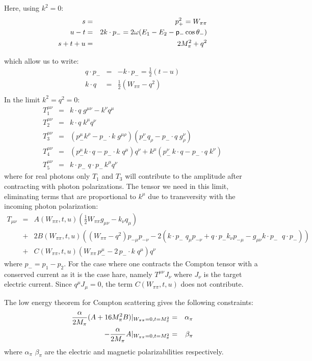 \documentclass[12pt,epsfig]{article}
\newcommand{\bea}{\begin{eqnarray}}
\newcommand{\eea}{\end{eqnarray}}
\begin{document}
Here, using $k^2=0$:
\bea
s&=& p_+^2=W_{\pi\pi}\nonumber\\
u-t&=&2 k \cdot p_-=2 \omega (E_1-E_2- { \sf{ p}}_- \cos \theta_-)\nonumber\\
s+t+u&=&2 M_\pi^2+q^2
\eea

which allow us to write:
\bea
q\cdot p_-&=& -k\cdot p_-=\frac{1}{2} (t-u)\nonumber\\
k\cdot q&=&\frac 12 (W_{\pi\pi}-q^2)\nonumber\\

\eea
In the limit $k^2=q^2=0$:
\bea
T_1^{\mu\nu}&=& k\cdot q\; g^{\mu\nu}-k^\nu q^\mu   \nonumber\\
T_2^{\mu\nu}&=&k\cdot q \; k^\mu  q^\nu   \nonumber\\
T_3^{\mu\nu}&=& (p_-^\mu k^\rho-p_-\!\cdot k \;g^{\mu\rho})(p_-^\nu q_\rho-p_-\!\cdot q \;g_\rho^\nu)  \nonumber\\
T_4^{\mu\nu}&=& (p_-^\mu k\cdot q-p_-\!\cdot k\; q^{\mu })  q^\nu+ k^\mu   (p_-^\nu \,k\cdot q-p_-\!\cdot q\; k^\nu)  \nonumber\\
T_5^{\mu\nu}&=&  k\cdot  p_- \; q\cdot  p_- \,k^\mu q^\nu 
\eea
where for real photons only $T_1$ and $T_3$ will contribute to the amplitude after contracting with photon polarizations. 
The tensor we need in this limit, eliminating terms that are proportional to $k^\mu$ due to transversity with the incoming photon polarization:
\bea
T_{\mu\nu}&=&A(W_{\pi\pi},t,u) (\frac 12 W_{\pi\pi} g_{\mu\nu}-k_\nu q_\mu)\\
&+&2 B(W_{\pi\pi},t,u)  ( (W_{\pi\pi}-q^2) p_{-\mu} p_{-\nu}-2(k\cdot p_-\; q_\mu p_{-\nu}+q\cdot p_{-} k_\nu p_{-\mu}-g_{\mu\nu} k \cdot p_-\; \;q\cdot p_-))\nonumber\\ 
&+& C(W_{\pi\pi},t,u) ( W_{\pi\pi}\,p_-^\mu -2\, p_-\! \cdot k\; q^\mu) q^\nu
\eea
where $p_-=p_1-p_2$. For the case where one contracts the Compton tensor with a conserved current as it is the case hare, namely $T^{\mu\nu} J_\nu$ where $J_\nu$ is the target electric current. Since $q^\mu J_\mu=0$, the term $C(W_{\pi\pi},t,u)$ does not contribute.

The low energy theorem for Compton scattering gives the following constraints:
\bea
\frac{\alpha}{2 M_\pi} (A+16 M_\pi^2 B)\arrowvert_{W_{\pi\pi}=0, t=M_\pi^2}&=& \alpha_{\pi}\nonumber\\
-\frac{\alpha}{2 M_\pi} A\arrowvert_{W_{\pi\pi}=0, t=M_\pi^2}&=& \beta_{\pi}
\eea
where $ \alpha_{\pi}$ $ \beta_{\pi}$ are the electric and magnetic polarizabilities respectively.
\end{document}
